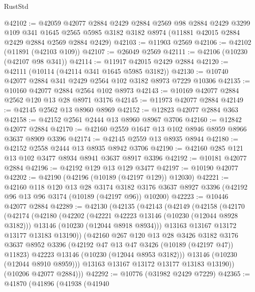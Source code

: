 \begin{lexlean}{RustStd}
\begin{coremodule}
@42102 := @42059
    @42077
    @2884
    @2429
    @2884
    @2569
    @98
    @2884
    @2429
    @3299
    @109
    @341
    @1645
    @2565
    @5985
    @3182
    @3182
    @8974
    (@11881 @42015 @2884 @2429 @2884 @2569 @2884 @2429)
@42103 := @11903 @2569
@42106 := @42102 (@11891 (@42103 @109))
@42107 := @26049 @2569
@42111 := @42106 (@10230 (@42107 @98 @341))
@42114 := @11917 @42015 @2429 @2884
@42120 := @42111 (@10114 (@42114 @341 @1645 @5985 @3182))
@42130 := @10740 @42077 @2884 @341 @2429 @2564 @102 @3182 @8973 @7229 @10306
@42135 := @10160 @42077 @2884 @2564 @102 @8973
@42143 := @10169 @42077 @2884 @2562 @120 @13 @28 @8971 @3176
@42145 := @11973 @42077 @2884
@42149 := @42145 @2562 @13 @8960 @8969
@42152 := @12823 @42077 @2884 @363
@42158 := @42152 @2561 @2444 @13 @8960 @8967 @3706
@42160 := @12842 @42077 @2884
@42170 := @42160 @2559 @1647 @13 @102 @8946 @8959 @8966 @3637 @8909 @3396
@42174 := @42145 @2559 @13 @8935 @8944
@42180 := @42152 @2558 @2444 @13 @8935 @8942 @3706
@42190 := @42160 @285 @121 @13 @102 @3477 @8934 @8941 @3637 @8917 @3396
@42192 := @10181 @42077 @2884
@42196 := @42192 @129 @13 @129 @3477
@42197 := @10190 @42077
@42202 := @42190 (@42196 (@10189 (@42197 @129)) @12030)
@42221 := @42160
    @118
    @120
    @13
    @28
    @3174
    @3182
    @3176
    @3637
    @8927
    @3396
    (@42192 @96 @13 @96 @3174 (@10189 (@42197 @96)) @10200)
@42223 := @10446 @42077 @2884
@42289 := @42130
    (@42135
      (@42143
        (@42149
          (@42158
            (@42170
              (@42174
                (@42180
                  (@42202
                    (@42221 @42223 @13146 (@10230 (@12044 @8928 @3182)))
                    @13146
                    (@10230 (@12044 @8918 @8934)))
                  @13163
                  @13167
                  @13172
                  @13177
                  @13183
                  @13190))
              (@42160
                @267
                @120
                @13
                @28
                @3426
                @3182
                @3176
                @3637
                @8952
                @3396
                (@42192 @47 @13 @47 @3426 (@10189 (@42197 @47)) @11823)
                @42223
                @13146
                (@10230 (@12044 @8953 @3182)))
              @13146
              (@10230 (@12044 @8910 @8959)))
            @13163
            @13167
            @13172
            @13177
            @13183
            @13190))
        (@10206 @42077 @2884)))
@42292 := @10776 (@31982 @2429 @7229)
@42365 := @41870
    (@41896
      (@41938
        (@41940

\end{coremodule}
\end{lexlean}
